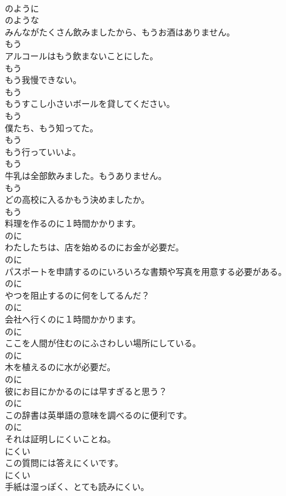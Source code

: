 \documentclass[8pt]{extreport}
\begin{document}
\begin{CJK}{UTF8}{min}
\\	のように 
\\	のような
\\	みんながたくさん飲みましたから、もうお酒はありません。	
\\	もう
\\	アルコールはもう飲まないことにした。	
\\	もう
\\	もう我慢できない。	
\\	もう
\\	もうすこし小さいボールを貸してください。	
\\	もう
\\	僕たち、もう知ってた。	
\\	もう
\\	もう行っていいよ。	
\\	もう
\\	牛乳は全部飲みました。もうありません。	
\\	もう
\\	どの高校に入るかもう決めましたか。	
\\	もう
\\	料理を作るのに１時間かかります。	
\\	のに
\\	わたしたちは、店を始めるのにお金が必要だ。	
\\	のに
\\	パスポートを申請するのにいろいろな書類や写真を用意する必要がある。	
\\	のに
\\	やつを阻止するのに何をしてるんだ？	
\\	のに
\\	会社へ行くのに１時間かかります。	
\\	のに
\\	ここを人間が住むのにふさわしい場所にしている。	
\\	のに
\\	木を植えるのに水が必要だ。	
\\	のに
\\	彼にお目にかかるのには早すぎると思う？	
\\	のに
\\	この辞書は英単語の意味を調べるのに便利です。	
\\	のに
\\	それは証明しにくいことね。	
\\	にくい
\\	この質問には答えにくいです。	
\\	にくい
\\	手紙は湿っぽく、とても読みにくい。	

\end{CJK}
\end{document}
